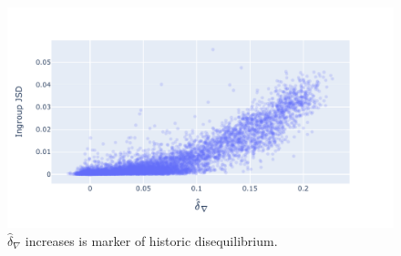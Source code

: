 \begin{figure}[htbp]
\centering
\includegraphics[width=\textwidth]{figures/plots/microbial/d-conv-JSD.pdf}
\caption{$\hat\delta_\nabla$ increases is marker of historic disequilibrium.}
\label{fig:microbial/d-conv/JSD}
\end{figure}